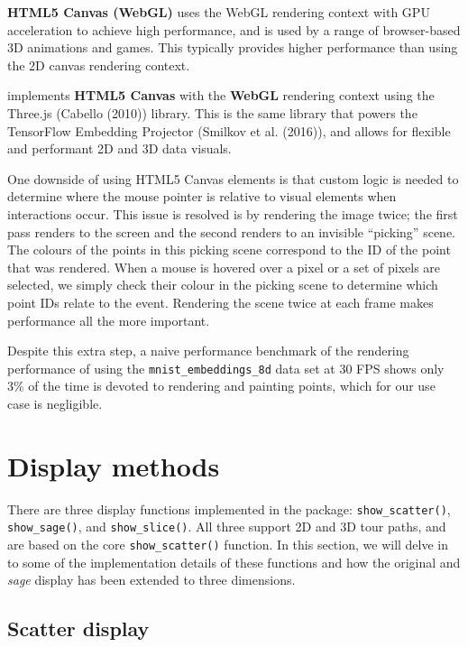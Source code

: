 \textbf{HTML5 Canvas (WebGL)} uses the WebGL rendering context with GPU acceleration to achieve high performance, and is used by a range of browser-based 3D animations and games. This typically provides higher performance than using the 2D canvas rendering context.

 implements \textbf{HTML5 Canvas} with the \textbf{WebGL} rendering context using the Three.js (Cabello (2010)) library. This is the same library that powers the TensorFlow Embedding Projector (Smilkov et al. (2016)), and allows for flexible and performant 2D and 3D data visuals.

One downside of using HTML5 Canvas elements is that custom logic is needed to determine where the mouse pointer is relative to visual elements when interactions occur. This issue is resolved is by rendering the image twice; the first pass renders to the screen and the second renders to an invisible ``picking'' scene. The colours of the points in this picking scene correspond to the ID of the point that was rendered. When a mouse is hovered over a pixel or a set of pixels are selected, we simply check their colour in the picking scene to determine which point IDs relate to the event. Rendering the scene twice at each frame makes performance all the more important.

Despite this extra step, a naive performance benchmark of the rendering performance of  using the \texttt{mnist\_embeddings\_8d} data set at 30 FPS shows only 3\% of the time is devoted to rendering and painting points, which for our use case is negligible.

\hypertarget{display-methods-1}{%
\section{Display methods}\label{display-methods-1}}

There are three display functions implemented in the  package: \texttt{show\_scatter()}, \texttt{show\_sage()}, and \texttt{show\_slice()}. All three support 2D and 3D tour paths, and are based on the core \texttt{show\_scatter()} function. In this section, we will delve in to some of the implementation details of these functions and how the original and \emph{sage} display has been extended to three dimensions.

\hypertarget{scatter-display}{%
\subsection{Scatter display}\label{scatter-display}}

